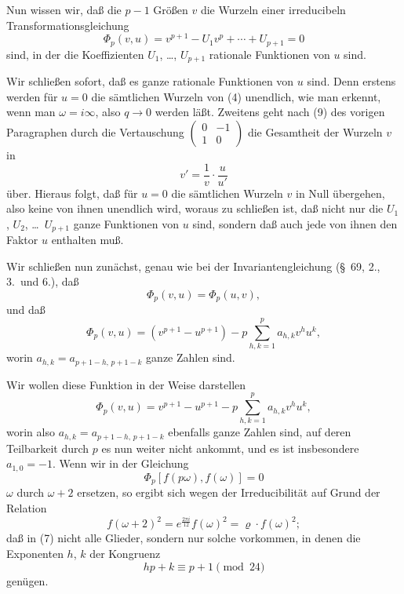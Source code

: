 \documentclass[12pt,a4paper]{article}
\theoremstyle{definition}
\begin{document}
Nun wissen wir, daß die $p-1$ Größen $v$ die Wurzeln einer irreducibeln Transformationsgleichung
\begin{equation}\label{eq:74-4}
\Phi_p(v, u) = v^{p+1} - U_1 v^p + \cdots + U_{p+1} = 0
\end{equation}
sind, in der die Koeffizienten $U_1$, \ldots, $U_{p+1}$ rationale Funktionen von $u$ sind.

Wir schließen sofort, daß es ganze rationale Funktionen von $u$ sind. Denn erstens werden für $u = 0$ die sämtlichen Wurzeln von (4) unendlich, wie man erkennt, wenn man $\omega = i\infty$, also $q \to 0$ werden läßt. Zweitens geht nach (9) des vorigen Paragraphen durch die Vertauschung $\begin{pmatrix} 0 & -1 \\ 1 & 0 \end{pmatrix}$ die Gesamtheit der Wurzeln $v$ in
\[
v' = \frac{1}{v} \cdot \frac{u}{u'}
\]
über. Hieraus folgt, daß für $u = 0$ die sämtlichen Wurzeln $v$ in Null übergehen, also keine von ihnen unendlich wird, woraus zu schließen ist, daß nicht nur die $U_1$, $U_2$, \ldots\ $U_{p+1}$ ganze Funktionen von $u$ sind, sondern daß auch jede von ihnen den Faktor $u$ enthalten muß.

Wir schließen nun zunächst, genau wie bei der Invariantengleichung (\S\ 69, 2., 3.\ und 6.), daß
\begin{equation}\label{eq:74-5}
\Phi_p(v, u) = \Phi_p(u, v),
\end{equation}
und daß
\begin{equation}\label{eq:74-6}
\Phi_p(v, u) = (v^{p+1} - u^{p+1}) - p \sum_{h,k=1}^{p} a_{h,k} v^h u^k,
\end{equation}
worin $a_{h,k} = a_{p+1-h,\,p+1-k}$ ganze Zahlen sind.

Wir wollen diese Funktion in der Weise darstellen
\begin{equation}\label{eq:74-7}
\Phi_p(v, u) = v^{p+1} - u^{p+1} - p \sum_{h,k=1}^{p} a_{h,k} v^h u^k,
\end{equation}
worin also $a_{h,k} = a_{p+1-h,\,p+1-k}$ ebenfalls ganze Zahlen sind, auf deren Teilbarkeit durch $p$ es nun weiter nicht ankommt, und es ist insbesondere $a_{1,0} = -1$. Wenn wir in der Gleichung
\[
\Phi_p[f(p\omega), f(\omega)] = 0
\]
$\omega$ durch $\omega + 2$ ersetzen, so ergibt sich wegen der Irreducibilität auf Grund der Relation
\[
f(\omega + 2)^2 = e^{\frac{2\pi i}{12}} f(\omega)^2 = \varrho \cdot f(\omega)^2;
\]
daß in (7) nicht alle Glieder, sondern nur solche vorkommen, in denen die Exponenten $h$, $k$ der Kongruenz
\begin{equation}\label{eq:74-8}
hp + k \equiv p + 1 \pmod{24}
\end{equation}
genügen.
\end{document}
